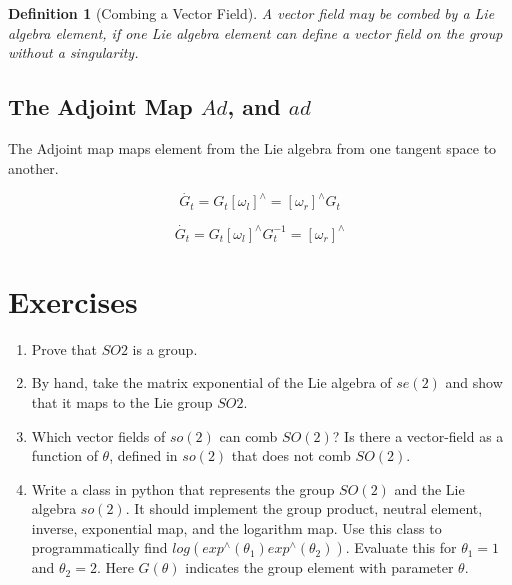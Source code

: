\documentclass{book}
\newtheorem{definition}{Definition}
\begin{document}
\begin{definition}[Combing a Vector Field]
A vector field may be combed by a Lie algebra element, if one Lie algebra element can 
define a vector field on the group without a singularity.
\end{definition}

\subsection*{The Adjoint Map $Ad$, and $ad$}

The Adjoint map maps element from the Lie algebra from one tangent space to another.

$$\dot{G_t} = G_t [\omega_l]^{\wedge} = [\omega_r]^{\wedge} G_t $$

$$\dot{G_t} = G_t [\omega_l]^{\wedge} G_t^{-1} = [\omega_r]^{\wedge}$$


\section*{Exercises}

\begin{enumerate}
    \item Prove that $SO2$ is a group.
    \item By hand, take the matrix exponential of the Lie algebra of $se(2)$ and show that it
      maps to the Lie group $SO2$.
    \item Which vector fields of $so(2)$ can comb $SO(2)$? Is there a vector-field as a
      function of $\theta$, defined in $so(2)$ that does not comb $SO(2)$.
    \item Write a class in python that represents the group $SO(2)$ and the Lie algebra $so(2)$.
      It should implement the group product, neutral element, inverse, exponential map,
      and the logarithm map. Use this class to programmatically find $log(exp^\wedge(\theta_1)exp^\wedge(\theta_2))$.
      Evaluate this for $\theta_1=1$ and $\theta_2=2$.  Here $G(\theta)$ indicates the group element with parameter $\theta$.
\end{enumerate}
\end{document}
